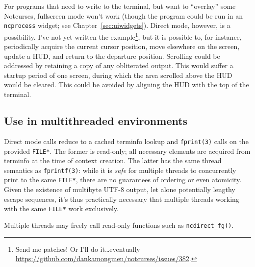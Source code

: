 \documentclass[letterpaper,10pt]{article}
\begin{document}
For programs that need to write to the terminal, but want to ``overlay'' some
Notcurses, fullscreen mode won't work (though the program could be run in an
\texttt{ncprocess} widget; see Chapter~\ref{sec:uiwidgets}). Direct mode, however, is
a possibility. I've not yet written the example\footnote{Send me patches! Or
I'll do it\ldots eventually \url{https://github.com/dankamongmen/notcurses/issues/382}.}, but it is possible to, for
instance, periodically acquire the current cursor position, move elsewhere on
the screen, update a HUD, and return to the departure position. Scrolling could
be addressed by retaining a copy of any obliterated output. This would suffer
a startup period of one screen, during which the area scrolled above the HUD
would be cleared. This could be avoided by aligning the HUD with the top of
the terminal.

\subsection{Use in multithreaded environments}
\label{sec:directthreads}
Direct mode calls reduce to a cached terminfo lookup and \texttt{fprint(3)}
calls on the provided \texttt{FILE*}. The former is read-only; all necessary
elements are acquired from terminfo at the time of context creation. The latter
has the same thread semantics as \texttt{fprintf(3)}: while it is \textit{safe}
for multiple threads to concurrently print to the same \texttt{FILE*}, there are
no guarantees of ordering or even atomicity. Given the existence of multibyte
UTF-8 output, let alone potentially lengthy escape sequences, it's thus practically
necessary that multiple threads working with the same \texttt{FILE*} work exclusively.

Multiple threads may freely call read-only functions such as \texttt{ncdirect\_fg()}.

\cleardoublepage

\end{document}
